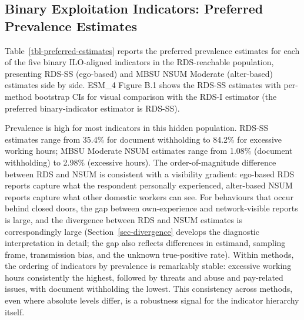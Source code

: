 \documentclass[
  12pt,
  letterpaper,
  DIV=11,
  numbers=noendperiod]{scrartcl}
\begin{document}
\subsection{Binary Exploitation Indicators: Preferred Prevalence
Estimates}\label{sec-binary-results}

Table~\ref{tbl-preferred-estimates} reports the preferred prevalence
estimates for each of the five binary ILO-aligned indicators in the
RDS-reachable population, presenting RDS-SS (ego-based) and MBSU NSUM
Moderate (alter-based) estimates side by side. ESM\_4 Figure B.1 shows
the RDS-SS estimates with per-method bootstrap CIs for visual comparison
with the RDS-I estimator (the preferred binary-indicator estimator is
RDS-SS).

Prevalence is high for most indicators in this hidden population. RDS-SS
estimates range from 35.4\% for document withholding to 84.2\% for
excessive working hours; MBSU Moderate NSUM estimates range from 1.08\%
(document withholding) to 2.98\% (excessive hours). The
order-of-magnitude difference between RDS and NSUM is consistent with a
visibility gradient: ego-based RDS reports capture what the respondent
personally experienced, alter-based NSUM reports capture what other
domestic workers can see. For behaviours that occur behind closed doors,
the gap between own-experience and network-visible reports is large, and
the divergence between RDS and NSUM estimates is correspondingly large
(Section~\ref{sec-divergence} develops the diagnostic interpretation in
detail; the gap also reflects differences in estimand, sampling frame,
transmission bias, and the unknown true-positive rate). Within methods,
the ordering of indicators by prevalence is remarkably stable: excessive
working hours consistently the highest, followed by threats and abuse
and pay-related issues, with document withholding the lowest. This
consistency across methods, even where absolute levels differ, is a
robustness signal for the indicator hierarchy itself.
\end{document}
